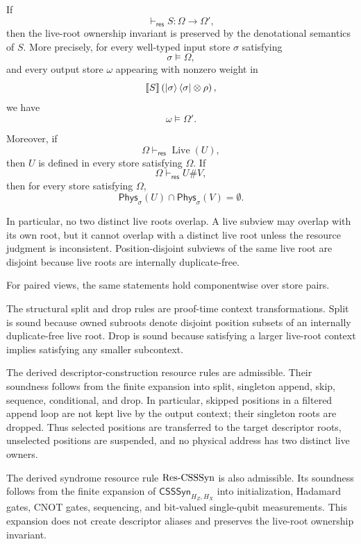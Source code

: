 \documentclass[acmsmall,screen,review,anonymous,nonacm]{acmart}
\theoremstyle{defn_style}
\begin{document}
\begin{theorem}
If
\[
\vdash_{\mathsf{res}}S:\Omega\rightarrow\Omega',
\]
then the live-root ownership invariant is preserved by the denotational
semantics of \(S\). More precisely, for every well-typed input store \(\sigma\)
satisfying
\[
\sigma\models\Omega,
\]
and every output store \(\omega\) appearing with nonzero weight in
\[
\llbracket S\rrbracket
\left(
\ket{\sigma}\bra{\sigma}\otimes\rho
\right),
\]
we have
\[
\omega\models\Omega'.
\]

Moreover, if
\[
\Omega\vdash_{\mathsf{res}}\operatorname{Live}(U),
\]
then \(U\) is defined in every store satisfying \(\Omega\). If
\[
\Omega\vdash_{\mathsf{res}}U\#V,
\]
then for every store satisfying \(\Omega\),
\[
\mathsf{Phys}_{\sigma}(U)\cap\mathsf{Phys}_{\sigma}(V)=\emptyset.
\]

In particular, no two distinct live roots overlap. A live subview may overlap
with its own root, but it cannot overlap with a distinct live root unless the
resource judgment is inconsistent. Position-disjoint subviews of the same live
root are disjoint because live roots are internally duplicate-free.

For paired views, the same statements hold componentwise over store pairs.

The structural split and drop rules are proof-time context transformations.
Split is sound because owned subroots denote disjoint position subsets of an
internally duplicate-free live root. Drop is sound because satisfying a larger
live-root context implies satisfying any smaller subcontext.

The derived descriptor-construction resource rules are admissible. Their
soundness follows from the finite expansion into split, singleton append, skip,
sequence, conditional, and drop. In particular, skipped positions in a filtered
append loop are not kept live by the output context; their singleton roots are
dropped. Thus selected positions are transferred to the target descriptor roots,
unselected positions are suspended, and no physical address has two distinct
live owners.

The derived syndrome resource rule \({\rm Res\mbox{-}CSSSyn}\) is also
admissible. Its soundness follows from the finite expansion of
\(\mathsf{CSSSyn}_{H_Z,H_X}\) into initialization, Hadamard gates, CNOT gates,
sequencing, and bit-valued single-qubit measurements. This expansion does not
create descriptor aliases and preserves the live-root ownership invariant.


\end{theorem}
\end{document}
